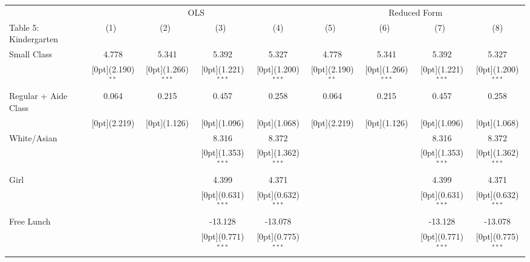 \documentclass[a4paper,11pt]{article}
\begin{document}
\begin{table}[H]
	\setlength\tabcolsep{1.75pt} 
\begin{tabular*}{\textwidth}{@{\extracolsep{\fill}}lcccccccc}				
	& \multicolumn{4}{c}{OLS}  & \multicolumn{4}{c}{Reduced Form}\\
	\cline{2-5}	\cline{6-9}			
	Table 5: Kindergarten & \multicolumn{1}{c}{(1)\mbox{\ }} &	\multicolumn{1}{c}{(2)\mbox{\ }} &	\multicolumn{1}{c}{(3)\mbox{\ }} &	\multicolumn{1}{c}{(4)} & \multicolumn{1}{c}{(5)\mbox{\ }} &	\multicolumn{1}{c}{(6)\mbox{\ }} &	\multicolumn{1}{c}{(7)\mbox{\ }} &	\multicolumn{1}{c}{(8)} \\
	\hline				
	Small Class &	4.778 &	5.341 &	5.392 &	5.327  & 4.778 &	5.341 &	5.392 &	5.327\\
	&	\raisebox{.7ex}[0pt]{\scriptsize (2.190)$^{**}$} &	\raisebox{.7ex}[0pt]{\scriptsize (1.266)$^{***}$} &	\raisebox{.7ex}[0pt]{\scriptsize (1.221)$^{***}$} &	\raisebox{.7ex}[0pt]{\scriptsize (1.200)$^{***}$} &	\raisebox{.7ex}[0pt]{\scriptsize (2.190)$^{**}$} &	\raisebox{.7ex}[0pt]{\scriptsize (1.266)$^{***}$} &	\raisebox{.7ex}[0pt]{\scriptsize (1.221)$^{***}$} &	\raisebox{.7ex}[0pt]{\scriptsize (1.200)$^{***}$} \\
	Regular + Aide Class &	0.064 &	0.215 &	0.457 &	0.258 &	0.064 &	0.215 &	0.457 &	0.258 \\
	&	\raisebox{.7ex}[0pt]{\scriptsize (2.219)} &	\raisebox{.7ex}[0pt]{\scriptsize (1.126)} &	\raisebox{.7ex}[0pt]{\scriptsize (1.096)} &	\raisebox{.7ex}[0pt]{\scriptsize (1.068)} 	&	\raisebox{.7ex}[0pt]{\scriptsize (2.219)} &	\raisebox{.7ex}[0pt]{\scriptsize (1.126)} &	\raisebox{.7ex}[0pt]{\scriptsize (1.096)} &	\raisebox{.7ex}[0pt]{\scriptsize (1.068)}\\
	White/Asian &	&	&	8.316 &	8.372 &	&	&	8.316 &	8.372  \\
	&	&	&	\raisebox{.7ex}[0pt]{\scriptsize (1.353)$^{***}$} &	\raisebox{.7ex}[0pt]{\scriptsize (1.362)$^{***}$} 	&	&	&	\raisebox{.7ex}[0pt]{\scriptsize (1.353)$^{***}$} &	\raisebox{.7ex}[0pt]{\scriptsize (1.362)$^{***}$}\\
	Girl &	&	&	4.399 &	4.371 &	&	&	4.399 &	4.371 \\
	&	&	&	\raisebox{.7ex}[0pt]{\scriptsize (0.631)$^{***}$} &	\raisebox{.7ex}[0pt]{\scriptsize (0.632)$^{***}$} &	&	&	\raisebox{.7ex}[0pt]{\scriptsize (0.631)$^{***}$} &	\raisebox{.7ex}[0pt]{\scriptsize (0.632)$^{***}$}\\
	Free Lunch &	&	&	-13.128 &	-13.078  &	&	&	-13.128 &	-13.078\\
	&	&	&	\raisebox{.7ex}[0pt]{\scriptsize (0.771)$^{***}$} &	\raisebox{.7ex}[0pt]{\scriptsize (0.775)$^{***}$} &	&	&	\raisebox{.7ex}[0pt]{\scriptsize (0.771)$^{***}$} &	\raisebox{.7ex}[0pt]{\scriptsize (0.775)$^{***}$}\\

\end{tabular*}
\end{table}
\end{document}
